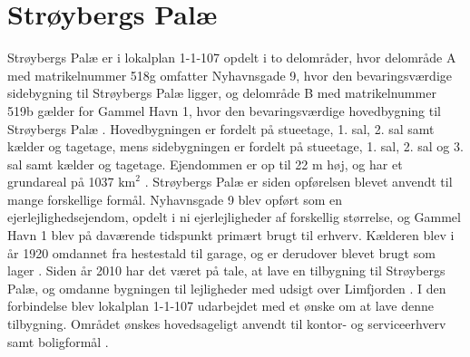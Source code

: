 \section{Strøybergs Palæ}
Strøybergs Palæ er i lokalplan 1-1-107 opdelt i to delområder, hvor delområde A med matrikelnummer 518g omfatter Nyhavnsgade 9, hvor den bevaringsværdige sidebygning til Strøybergs Palæ ligger, og delområde B med matrikelnummer 519b gælder for Gammel Havn 1, hvor den bevaringsværdige hovedbygning til Strøybergs Palæ \citep[ s. 7]{lokalplan}. Hovedbygningen er fordelt på stueetage, 1. sal, 2. sal samt kælder og tagetage, mens sidebygningen er fordelt på stueetage, 1. sal, 2. sal og 3. sal samt kælder og tagetage. Ejendommen er op til 22 m høj, og har et grundareal på 1037 $\text{km}^2$ \citep{byggesagen}.
\newline \indent{     }  Strøybergs Palæ er siden opførelsen blevet anvendt til mange forskellige formål. Nyhavnsgade 9 blev opført som en ejerlejlighedsejendom, opdelt i ni ejerlejligheder af forskellig størrelse, og Gammel Havn 1 blev på daværende tidspunkt primært brugt til erhverv. Kælderen blev i år 1920 omdannet fra hestestald til garage, og er derudover blevet brugt som lager \citep{byggesagen}.
\newline \indent{     }  Siden år 2010 har det været på tale, at lave en tilbygning til Strøybergs Palæ, og omdanne bygningen til lejligheder med udsigt over Limfjorden \citep{Calum}. I den forbindelse blev lokalplan 1-1-107 udarbejdet med et ønske om at lave denne tilbygning. Området ønskes hovedsageligt anvendt til kontor- og serviceerhverv samt boligformål \citep[ s. 7]{lokalplan}.